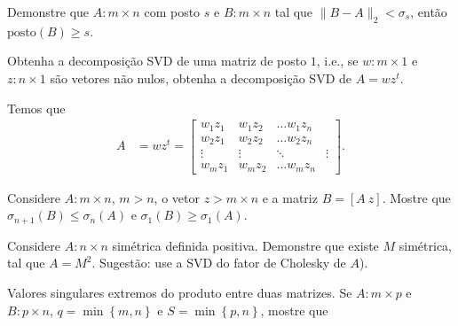 \documentclass[a4paper,12pt, leqno, answers]{exam}
\begin{document}
\begin{questions}
    \question Demonstre que $A : m \times n$ com posto $s$ e $B : m \times n$ tal que $\| B - A \|_2 < \sigma_s$, ent\~{a}o $\mathrm{posto}(B) \geq s$.
    \begin{solution}
    \end{solution}

    \question Obtenha a decomposi\c{c}\~{a}o SVD de uma matriz de posto $1$, i.e., se $w : m \times 1$ e $z : n \times 1$ s\~{a}o vetores n\~{a}o nulos, obtenha a decomposi\c{c}\~{a}o SVD de $A = w z^t$.
    \begin{solution}
        Temos que
        \begin{align*}
            A &= w z^t = \begin{bmatrix}
                w_1 z_1 & w_1 z_2 & \ldots w_1 z_n \\
                w_2 z_1 & w_2 z_2 & \ldots w_2 z_n \\
                \vdots & \vdots & \ddots & \vdots \\
                w_m z_1 & w_m z_2 & \ldots w_m z_n
            \end{bmatrix}.
        \end{align*}
    \end{solution}

    \question Considere $A : m \times n$, $m > n$, o vetor $z > m \times n$ e a matriz $B = [A \ z]$. Mostre que $\sigma_{n + 1}(B) \leq \sigma_n(A)$ e $\sigma_1(B) \geq \sigma_1(A)$.
    \begin{solution}
    \end{solution}

     Considere $A : n \times n$ sim\'{e}trica definida positiva. Demonstre que existe $M$ sim\'{e}trica, tal que $A = M^2$. Sugest\~{a}o: use a SVD do fator de Cholesky de $A$).
    \begin{solution}
    \end{solution}

    \question Valores singulares extremos do produto entre duas matrizes. Se $A : m \times p$ e $B : p \times n$, $q = \min\left\{ m, n \right\}$ e $S = \min\left\{ p, n \right\}$, mostre que
\end{questions}
\end{document}
